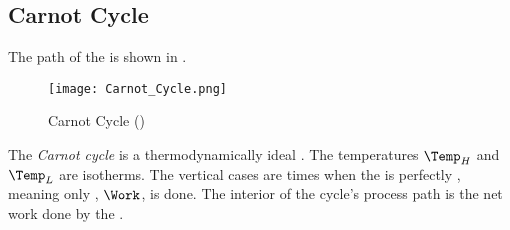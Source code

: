 \subsection{Carnot Cycle}\label{subsec:Carnot_Cycle}
The  path of the  is shown in .

\begin{figure}[h!tbp]
  \centering
  \texttt{[image: Carnot\_Cycle.png]}
  \caption{Carnot Cycle (\cite[pg. 252]{ThermoTextbook})}
  \label{fig:Carnot_Cycle}
\end{figure}

\begin{definition}\label{def:Carnot_Cycle}
  The \emph{Carnot cycle} is a thermodynamically ideal .
  The temperatures $\Temp_{H}$ and $\Temp_{L}$ are isotherms.
  The vertical cases are times when the  is perfectly , meaning only , $\Work$, is done.
  The interior of the cycle's process path is the net work done by the .
\end{definition}


